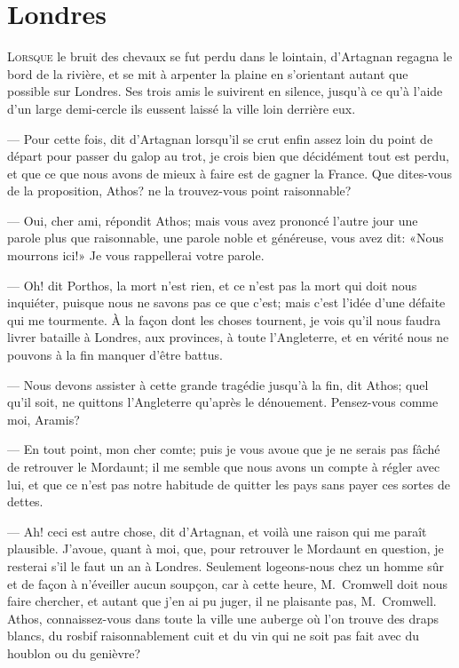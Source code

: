 \chapter{Londres}

\lettrine{L}{orsque} le bruit des chevaux se fut perdu dans le lointain, d'Artagnan regagna le bord de la rivière, et se mit à arpenter la plaine en s'orientant autant que possible sur Londres. Ses trois amis le suivirent en silence, jusqu'à ce qu'à l'aide d'un large demi-cercle ils eussent laissé la ville loin derrière eux.

— Pour cette fois, dit d'Artagnan lorsqu'il se crut enfin assez loin du point de départ pour passer du galop au trot, je crois bien que décidément tout est perdu, et que ce que nous avons de mieux à faire est de gagner la France. Que dites-vous de la proposition, Athos? ne la trouvez-vous point raisonnable?

— Oui, cher ami, répondit Athos; mais vous avez prononcé l'autre jour une parole plus que raisonnable, une parole noble et généreuse, vous avez dit: «Nous mourrons ici!» Je vous rappellerai votre parole.

— Oh! dit Porthos, la mort n'est rien, et ce n'est pas la mort qui doit nous inquiéter, puisque nous ne savons pas ce que c'est; mais c'est l'idée d'une défaite qui me tourmente. À la façon dont les choses tournent, je vois qu'il nous faudra livrer bataille à Londres, aux provinces, à toute l'Angleterre, et en vérité nous ne pouvons à la fin manquer d'être battus.

— Nous devons assister à cette grande tragédie jusqu'à la fin, dit Athos; quel qu'il soit, ne quittons l'Angleterre qu'après le dénouement. Pensez-vous comme moi, Aramis?

— En tout point, mon cher comte; puis je vous avoue que je ne serais pas fâché de retrouver le Mordaunt; il me semble que nous avons un compte à régler avec lui, et que ce n'est pas notre habitude de quitter les pays sans payer ces sortes de dettes.

— Ah! ceci est autre chose, dit d'Artagnan, et voilà une raison qui me paraît plausible. J'avoue, quant à moi, que, pour retrouver le Mordaunt en question, je resterai s'il le faut un an à Londres. Seulement logeons-nous chez un homme sûr et de façon à n'éveiller aucun soupçon, car à cette heure, M.~Cromwell doit nous faire chercher, et autant que j'en ai pu juger, il ne plaisante pas, M.~Cromwell. Athos, connaissez-vous dans toute la ville une auberge où l'on trouve des draps blancs, du rosbif raisonnablement cuit et du vin qui ne soit pas fait avec du houblon ou du genièvre?

